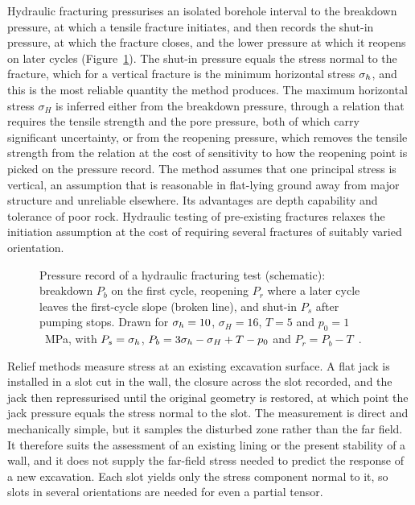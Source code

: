 Hydraulic fracturing pressurises an isolated borehole interval to the
breakdown pressure, at which a tensile fracture initiates, and then records
the shut-in pressure, at which the fracture closes, and the lower pressure at
which it reopens on later cycles (Figure~\ref{fig:hydrofrac-record}). The
shut-in pressure equals the stress normal
to the fracture, which for a vertical fracture is the minimum horizontal
stress $\sigma_h$, and this is the most reliable quantity the method produces. The
maximum horizontal stress $\sigma_H$ is inferred either from the breakdown pressure,
through a relation that requires the tensile strength and the pore pressure,
both of which carry significant uncertainty, or from the reopening pressure,
which removes the tensile strength from the relation at the cost of
sensitivity to how the reopening point is picked on the pressure record. The
method assumes that one principal
stress is vertical, an assumption that is reasonable in flat-lying ground away
from major structure and unreliable elsewhere. Its advantages are depth
capability and tolerance of poor rock. Hydraulic testing of pre-existing
fractures relaxes the initiation assumption at the cost of requiring several
fractures of suitably varied orientation.

\begin{figure}[htbp]
\centering
{}
\caption{Pressure record of a hydraulic fracturing test (schematic): breakdown $P_b$ on the first cycle, reopening $P_r$ where a later cycle leaves the first-cycle slope (broken line), and shut-in $P_s$ after pumping stops. Drawn for $\sigma_h = 10$, $\sigma_H = 16$, $T = 5$ and $p_0 = 1$~MPa, with $P_s = \sigma_h$, $P_b = 3\sigma_h - \sigma_H + T - p_0$ and $P_r = P_b - T$~\citep{amadei1997stress}.}
\label{fig:hydrofrac-record}
\end{figure}

Relief methods measure stress at an existing excavation surface. A flat jack
is installed in a slot cut in the wall, the closure across the slot recorded,
and the jack then repressurised until the original geometry is restored, at
which point the jack pressure equals the stress normal to the slot. The
measurement is direct and mechanically simple, but it samples the disturbed
zone rather than the far field. It therefore suits the assessment of an
existing lining or the present stability of a wall, and it does not supply
the far-field stress needed to predict the response of a new excavation.
Each slot yields only the stress component normal to it, so slots
in several orientations are needed for even a partial tensor.

